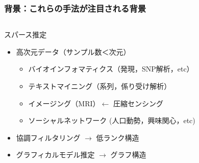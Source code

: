 \documentclass[9pt, dvipdfmx]{beamer}
\begin{document}
\begin{frame}
  \frametitle{背景：これらの手法が注目される背景}
  \begin{columns}
    \begin{column}[t]{.7\textwidth}
      \begin{block} {スパース推定}
        \begin{itemize}
          \item 高次元データ（サンプル数＜次元）
            \begin{itemize}
              \item バイオインフォマティクス（発現，SNP解析，etc）
              \item テキストマイニング（系列，係り受け解析）
              \item イメージング（MRI）$\leftarrow$ 圧縮センシング
              \item ソーシャルネットワーク (人口動勢，興味関心，etc)
            \end{itemize}
          \item 協調フィルタリング $\rightarrow$ 低ランク構造
          \item グラフィカルモデル推定 $\rightarrow$ グラフ構造
        \end{itemize}
      \end{block}
    \end{column}
    \begin{column}{.3\textwidth}
    \end{column}
  \end{columns}
\end{frame}
\end{document}
